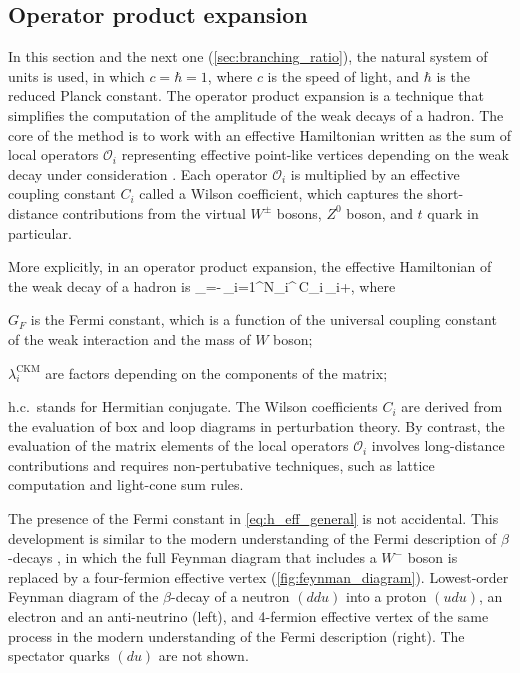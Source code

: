 \subsection{Operator product expansion} \label{sec:ope}
In this section and the next one (\cref{sec:branching_ratio}), the natural system of units is used, in which $c=\hbar=1$, where $c$ is the speed of light, and $\hbar$ is the reduced Planck constant.
The operator product expansion \cite{Wilson:1969zs, Wilson:1972ee} is a technique that simplifies the computation of the amplitude of the weak decays of a hadron.
The core of the method is to work with an effective Hamiltonian written as the sum of local operators $\mathcal{O}_i$ representing effective point-like vertices depending on the weak decay under consideration \cite{Buras:1998vd, Buras:1998raa, Buras:2005xt}.
Each operator $\mathcal{O}_i$ is multiplied by an effective coupling constant $C_i$ called a Wilson coefficient, which captures the short-distance contributions from the virtual $W^\pm$ bosons, $Z^0$ boson, and $t$ quark in particular.

More explicitly, in an operator product expansion, the effective Hamiltonian of the weak decay of a hadron is
\be \label{eq:h_eff_general}
_{}=-\,\sum_{i=1}^{N}\lambda_i^{}\,C_i\,_i+,
\ee
where
\bi
\item $G_F$ is the Fermi constant, which is a function of the universal coupling constant of the weak interaction and the mass of $W$ boson;
\item $\lambda_i^{\mathrm{CKM}}$ are factors depending on the components of the \CKM matrix;
\item h.c.~stands for Hermitian conjugate.
\ei
The Wilson coefficients $C_i$ are derived from the evaluation of box and loop diagrams in perturbation theory.
By contrast, the evaluation of the matrix elements of the local operators $\mathcal{O}_i$ involves long-distance contributions and requires non-pertubative techniques, such as lattice computation and light-cone sum rules.

The presence of the Fermi constant in \cref{eq:h_eff_general} is not accidental.
This development is similar to the modern understanding of the Fermi description of $\beta$-decays \cite{Fermi:1934hr, Feynman:1958ty}, in which the full Feynman diagram that includes a $W^-$ boson is replaced by a four-fermion effective vertex (\cref{fig:feynman_diagram}).
{Lowest-order Feynman diagram of the $\beta$-decay of a neutron $(ddu)$ into a proton $(udu)$, an electron and an anti-neutrino (left), and 4-fermion effective vertex of the same process in the modern understanding of the Fermi description (right).
The spectator quarks $(du)$ are not shown.}

